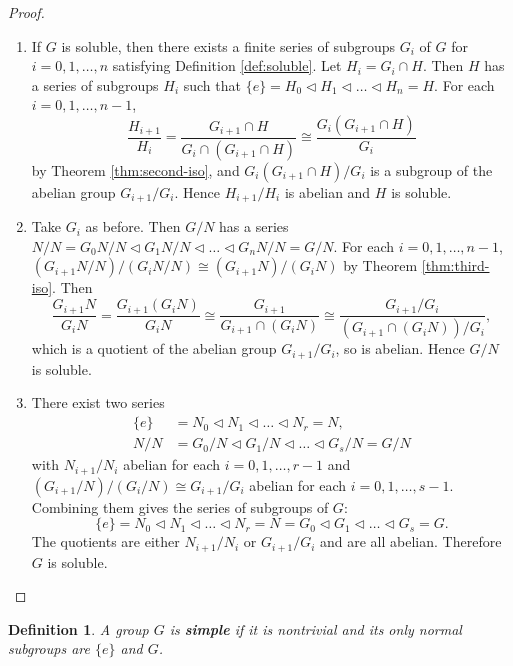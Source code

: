 \documentclass[12pt]{article}
\newtheorem{definition}[theorem]{Definition}
\begin{document}
\begin{proof}
\begin{enumerate}
    \item If $G$ is soluble, then there exists a finite series of subgroups $G_i$ of $G$ for $i = 0, 1, \dots, n$ satisfying Definition \ref{def:soluble}. Let $H_i = G_i \cap H$. Then $H$ has a series of subgroups $H_i$ such that $\{ e \} = H_0 \triangleleft H_1 \triangleleft \dots \triangleleft H_n = H.$
    For each $i = 0, 1, \dots, n - 1$, 
    $$
    \frac{H_{i+1}}{H_i} 
        = \frac{G_{i+1} \cap H}{G_i \cap (G_{i+1} \cap H)}
        \cong \frac{G_i(G_{i+1} \cap H)} {G_i}
    $$
    by Theorem \ref{thm:second-iso}, and ${G_i(G_{i+1} \cap H)}/{G_i}$ is a subgroup of the abelian group $G_{i+1} / G_{i}$. Hence $H_{i+1} / H_{i}$ is abelian and $H$ is soluble.
    \item Take $G_i$ as before. Then $G / N$ has a series
        $N/N = G_0 N / N \triangleleft G_1 N / N \triangleleft \dots \triangleleft G_n N / N  =  G / N. $
        For each $i = 0, 1, \dots, n - 1$, 
        $(G_{i+1} N / N) / (G_{i} N / N) \cong (G_{i+1} N) / (G_i N)$
    by Theorem \ref{thm:third-iso}. Then 
    $$
    \frac{G_{i+1} N}{G_i N} =\frac{G_{i+1}\left(G_i N\right)}{G_i N} \cong \frac{G_{i+1}}{G_{i+1} \cap\left(G_i N\right)} \cong \frac{G_{i+1} / G_i}{\left(G_{i+1} \cap\left(G_i N\right)\right) / G_i},
    $$
    which is a quotient of the abelian group $G_{i+1} / G_i$, so is abelian. Hence $G / N$ is soluble.
    \item There exist two series
$$
\begin{aligned}
\{ e \} & =N_0 \triangleleft N_1 \triangleleft \ldots \triangleleft N_r=N, \\
N / N & =G_0 / N \triangleleft G_1 / N \triangleleft \ldots \triangleleft G_s / N=G / N
\end{aligned}
$$
with $N_{i+1} / N_{i}$ abelian for each $i = 0, 1, \dots, r-1$ and $(G_{i+1} / N)  / (G_{i} / N) \cong G_{i+1} / G_i $ abelian for each $i = 0,1, \dots, s-1$. Combining them gives the series of subgroups of $G$:
$$
\{ e \}=N_0 \triangleleft N_1 \triangleleft \ldots \triangleleft N_r=N=G_0 \triangleleft G_1 \triangleleft \ldots \triangleleft G_s=G .
$$
The quotients are either $N_{i+1} / N_i$  or $G_{i+1} / G_i$ and are all abelian. Therefore $G$ is soluble.
\end{enumerate}
\end{proof}

\begin{definition}
    A group $G$ is \textbf{simple} if it is nontrivial and its only normal subgroups are $\{ e \}$ and $G$. 
\end{definition}
\end{document}
